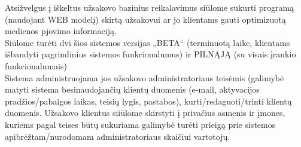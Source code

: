 \documentclass[a4paper,12pt]{article}
\newcommand\AtPageUpperRight[1]{\AtPageUpperLeft{%
   \makebox[\paperwidth][r]{#1}}}
\begin{document}



    Atsižvelgus į iškeltus užsakovo bazinius reikalavimus siūlome sukurti programą (naudojant WEB modelį) skirtą užsakovui ar jo klientams gauti optimizuotą medienos pjovimo informaciją. \\ 

\vspace{-5mm}
    Siūlome turėti dvi šios sistemos  versijas „BETA“ (terminuotą laike, klientams išbandyti pagrindinius sistemos funkcionalumus) ir PILNĄJĄ (su visais įrankio funkcionalumais)\\
	
	\vspace{-5mm}
	Sistema administruojama jos užsakovo administratoriaus teisėmis (galimybė matyti sistema besinaudojančių klientų duomenis (e-mail, aktyvacijos pradžios/pabaigos laikas, teisių lygis, pastabos), kurti/redaguoti/trinti klientų duomenis. Užsakovo klientus siiūlome skirstyti į privačius asmenis ir įmones, kuriems pagal teises būtų sukuriama galimybė turėti prieigą prie sistemos apibrėžtam/nurodomam administratoriaus skaičiui vartotojų.\\
	
\end{document}
